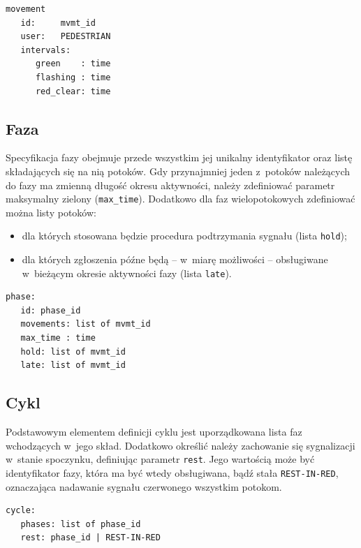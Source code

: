 \documentclass{pracamgr}
\theoremstyle{plain}
\begin{document}
\noindent\begin{minipage}{1.0\linewidth}
\begin{lstlisting}[caption=Schemat opisu dla potoku pieszych.]
movement
   id:     mvmt_id
   user:   PEDESTRIAN
   intervals:
      green    : time
      flashing : time
      red_clear: time
\end{lstlisting}
\end{minipage}

\subsection{Faza} Specyfikacja fazy obejmuje przede wszystkim jej
unikalny identyfikator oraz listę składających się na nią potoków.
Gdy przynajmniej jeden z~potoków należących do fazy ma zmienną długość
okresu aktywności, należy zdefiniować parametr maksymalny zielony
(\texttt{max\_time}).  Dodatkowo dla faz wielopotokowych zdefiniować
można listy potoków:
\begin{itemize}
  \item dla których stosowana będzie procedura podtrzymania sygnału
  (lista \texttt{hold});
  \item dla których zgłoszenia późne będą -- w~miarę możliwości --
  obsługiwane w~bieżącym okresie aktywności fazy (lista \texttt{late}).
\end{itemize}
\noindent\begin{minipage}{1.0\linewidth}
\begin{lstlisting}[caption=Schemat opisu fazy.]
phase:
   id: phase_id
   movements: list of mvmt_id
   max_time : time
   hold: list of mvmt_id
   late: list of mvmt_id
\end{lstlisting}
\end{minipage}

\subsection{Cykl} Podstawowym elementem definicji cyklu jest
uporządkowana lista faz wchodzących w~jego skład. Dodatkowo określić
należy zachowanie się sygnalizacji w~stanie spoczynku, definiując parametr
\texttt{rest}. Jego wartością może być identyfikator fazy,
która ma być wtedy obsługiwana, bądź stała \texttt{REST-IN-RED},
oznaczająca nadawanie sygnału czerwonego wszystkim potokom.

\noindent\begin{minipage}{1.0\linewidth}
\begin{lstlisting}[caption=Schemat opisu cyklu.]
cycle:
   phases: list of phase_id
   rest: phase_id | REST-IN-RED
\end{lstlisting}
\end{minipage}
  
\end{document}
